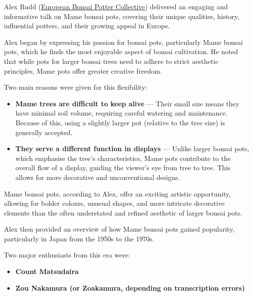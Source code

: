 \label{2025-04-pots}
\noindent
Alex Rudd (\href{https://www.europeanbonsaipottercollective.com}{European Bonsai Potter Collective}) delivered an engaging and informative talk on Mame bonsai pots, covering their unique qualities, history, influential potters, and their growing appeal in Europe.

Alex began by expressing his passion for bonsai pots, particularly Mame bonsai pots, which he finds the most enjoyable aspect of bonsai cultivation.
He noted that while pots for larger bonsai trees need to adhere to strict aesthetic principles, Mame pots offer greater creative freedom.

Two main reasons were given for this flexibility:

\begin{itemize}
    \item \textbf{Mame trees are difficult to keep alive} --- Their small size means they have minimal soil volume, requiring careful watering and maintenance.
    Because of this, using a slightly larger pot (relative to the tree size) is generally accepted.
    
    \item \textbf{They serve a different function in displays} --- Unlike larger bonsai pots, which emphasise the tree's characteristics, Mame pots contribute to the overall flow of a display, guiding the viewer's eye from tree to tree.
    This allows for more decorative and unconventional designs.
\end{itemize}

Mame bonsai pots, according to Alex, offer an exciting artistic opportunity, allowing for bolder colours, unusual shapes, and more intricate decorative elements than the often understated and refined aesthetic of larger bonsai pots.

\medskip

\noindent
Alex then provided an overview of how Mame bonsai pots gained popularity, particularly in Japan from the 1950s to the 1970s.

\medskip

\noindent
Two major enthusiasts from this era were:

\begin{itemize}
    \item \textbf{Count Matsudaira}
    \item \textbf{Zou Nakamura (or Zoakamura, depending on transcription errors)}
\end{itemize}

